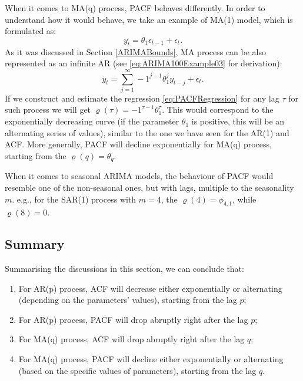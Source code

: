 \documentclass[]{book}
\providecommand{\tightlist}{%
  \setlength{\itemsep}{0pt}\setlength{\parskip}{0pt}}
\theoremstyle{definition}
\theoremstyle{definition}
\theoremstyle{definition}
\theoremstyle{definition}
\theoremstyle{remark}
\begin{document}
When it comes to MA(q) process, PACF behaves differently. In order to understand how it would behave, we take an example of MA(1) model, which is formulated as:
\begin{equation*}
  y_t = \theta_1 \epsilon_{t-1} + \epsilon_t.
\end{equation*}
As it was discussed in Section \ref{ARIMABounds}, MA process can be also represented as an infinite AR (see \eqref{eq:ARIMA100Example03} for derivation):
\begin{equation*}
  y_t = \sum_{j=1}^\infty -1^{j-1} \theta_1^j y_{t-j} + \epsilon_t.
\end{equation*}
If we construct and estimate the regression \eqref{eq:PACFRegression} for any lag \(\tau\) for such process we will get \(\varrho(\tau)=-1^{\tau-1} \theta_1^\tau\). This would correspond to the exponentially decreasing curve (if the parameter \(\theta_1\) is positive, this will be an alternating series of values), similar to the one we have seen for the AR(1) and ACF. More generally, PACF will decline exponentially for MA(q) process, starting from the \(\varrho(q)=\theta_q\).

When it comes to seasonal ARIMA models, the behaviour of PACF would resemble one of the non-seasonal ones, but with lags, multiple to the seasonality \(m\). e.g., for the SAR(1) process with \(m=4\), the \(\varrho(4)=\phi_{4,1}\), while \(\varrho(8)=0\).

\hypertarget{BJApproachSummary}{%
\subsection{Summary}\label{BJApproachSummary}}

Summarising the discussions in this section, we can conclude that:

\begin{enumerate}
\def\labelenumi{\arabic{enumi}.}
\tightlist
\item
  For AR(p) process, ACF will decrease either exponentially or alternating (depending on the parameters' values), starting from the lag \(p\);
\item
  For AR(p) process, PACF will drop abruptly right after the lag \(p\);
\item
  For MA(q) process, ACF will drop abruptly right after the lag \(q\);
\item
  For MA(q) process, PACF will decline either exponentially or alternating (based on the specific values of parameters), starting from the lag \(q\).
\end{enumerate}
\end{document}
